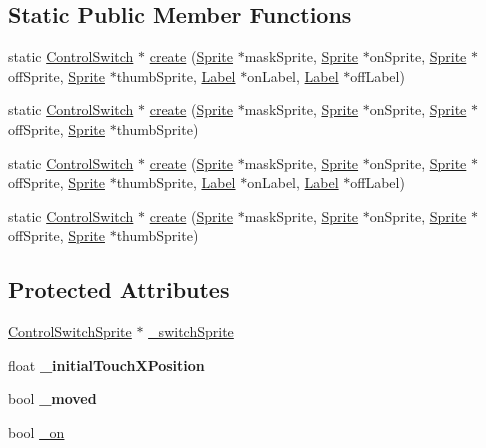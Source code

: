 \subsection*{Static Public Member Functions}
\begin{DoxyCompactItemize}
\item 
static \hyperlink{classControlSwitch}{Control\+Switch} $\ast$ \hyperlink{classControlSwitch_abe03717adad19f4aa909e86f8f5a3122}{create} (\hyperlink{classSprite}{Sprite} $\ast$mask\+Sprite, \hyperlink{classSprite}{Sprite} $\ast$on\+Sprite, \hyperlink{classSprite}{Sprite} $\ast$off\+Sprite, \hyperlink{classSprite}{Sprite} $\ast$thumb\+Sprite, \hyperlink{classLabel}{Label} $\ast$on\+Label, \hyperlink{classLabel}{Label} $\ast$off\+Label)
\item 
static \hyperlink{classControlSwitch}{Control\+Switch} $\ast$ \hyperlink{classControlSwitch_ad9eea6f59a69b426eefdad747484ed46}{create} (\hyperlink{classSprite}{Sprite} $\ast$mask\+Sprite, \hyperlink{classSprite}{Sprite} $\ast$on\+Sprite, \hyperlink{classSprite}{Sprite} $\ast$off\+Sprite, \hyperlink{classSprite}{Sprite} $\ast$thumb\+Sprite)
\item 
static \hyperlink{classControlSwitch}{Control\+Switch} $\ast$ \hyperlink{classControlSwitch_aab9a6eb701755481f6e9128447c796b2}{create} (\hyperlink{classSprite}{Sprite} $\ast$mask\+Sprite, \hyperlink{classSprite}{Sprite} $\ast$on\+Sprite, \hyperlink{classSprite}{Sprite} $\ast$off\+Sprite, \hyperlink{classSprite}{Sprite} $\ast$thumb\+Sprite, \hyperlink{classLabel}{Label} $\ast$on\+Label, \hyperlink{classLabel}{Label} $\ast$off\+Label)
\item 
static \hyperlink{classControlSwitch}{Control\+Switch} $\ast$ \hyperlink{classControlSwitch_a4ea8d7c87be7a46441dbc5c22173742f}{create} (\hyperlink{classSprite}{Sprite} $\ast$mask\+Sprite, \hyperlink{classSprite}{Sprite} $\ast$on\+Sprite, \hyperlink{classSprite}{Sprite} $\ast$off\+Sprite, \hyperlink{classSprite}{Sprite} $\ast$thumb\+Sprite)
\end{DoxyCompactItemize}
\subsection*{Protected Attributes}
\begin{DoxyCompactItemize}
\item 
\hyperlink{classControlSwitchSprite}{Control\+Switch\+Sprite} $\ast$ \hyperlink{classControlSwitch_a178f3ecaa1335d3521560ae6d24e8ff7}{\+\_\+switch\+Sprite}
\item 
\mbox{\label{classControlSwitch_a73e1ba3a4eed4acbd531619023c40a0f}} 
float {\bfseries \+\_\+initial\+Touch\+X\+Position}
\item 
\mbox{\label{classControlSwitch_ab6832cd634830691bba574edf9680648}} 
bool {\bfseries \+\_\+moved}
\item 
bool \hyperlink{classControlSwitch_a0f06a0c1dfaceba223dcaa2933a3d51e}{\+\_\+on}
\end{DoxyCompactItemize}
